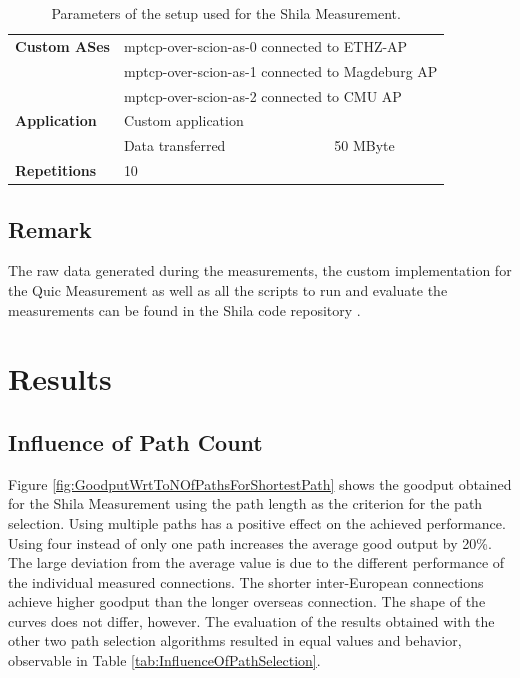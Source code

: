 \begin{table} [H]
	\centering
	\begin{tabular}{lll} 
		\toprule
		\textbf{Custom ASes} 		& \multicolumn{2}{l}{mptcp-over-scion-as-0 connected to ETHZ-AP}				\\
		& \multicolumn{2}{l}{mptcp-over-scion-as-1 connected to Magdeburg AP}			\\
		& \multicolumn{2}{l}{mptcp-over-scion-as-2 connected to CMU AP}					\smallskip \\ 
		\textbf{Application}		& Custom application						&								\\
		& Data transferred								& 50 MByte						\smallskip\\
		\textbf{Repetitions} 		& 10 											&								\\
		\bottomrule
	\end{tabular}
	\label{tab:ParameterQuicMeasurement}
	\caption{Parameters of the setup used for the Shila Measurement.}
\end{table}

\subsection*{Remark}
\label{subsec:SetupRemarks}

The raw data generated during the measurements, the custom implementation for the Quic Measurement as well as all the scripts to run and evaluate the measurements can be found in the Shila code repository \cite{ShilaGithub}.

\section{Results}
\label{sec:Results}

\subsection*{Influence of Path Count}
\label{subsec:InfluencePathCount}

Figure \ref{fig:GoodputWrtToNOfPathsForShortestPath} shows the goodput obtained for the Shila Measurement using the path length as the criterion for the path selection. Using multiple paths has a positive effect on the achieved performance.  Using four instead of only one path increases the average good output by 20\%. The large deviation from the average value is due to the different performance of the individual measured connections. The shorter inter-European connections achieve higher goodput than the longer overseas connection. The shape of the curves does not differ, however. The evaluation of the results obtained with the other two path selection algorithms resulted in equal values and behavior, observable in Table \ref{tab:InfluenceOfPathSelection}.

